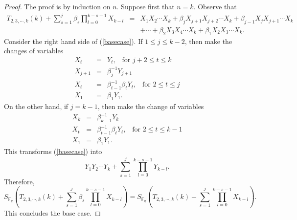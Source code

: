 \begin{proof}
The proof is by induction on $n$.  Suppose first that $n=k$.  Observe that
\begin{eqnarray}\nonumber
\label{basecase}
 T_{2,3,\cdots,k}(k)+\sum_{s=1}^j\beta_s\prod_{l=0}^{k-s-1}X_{k-l}&=& X_1X_2\cdots X_k+\beta_j X_{j+1}X_{j+2}\cdots X_k+\beta_{j-1} X_{j}X_{j+1}\cdots X_k\\
 &&+\cdots+ \beta_2 X_3 X_4\cdots X_k+  \beta_1 X_2 X_3\cdots X_k.
\end{eqnarray}
Consider the right hand side of (\ref{basecase}).  If $1\leq j\leq k-2$, then make the changes of variables
\begin{eqnarray*}
 X_t &=& Y_t, \,\,\, \text{ for }j+2\leq t \leq k \\
 X_{j+1}&=& \beta_j^{-1}Y_{j+1}\\
 X_t&=& \beta_{t-1}^{-1}\beta_t Y_t, \,\,\, \text{ for }2\leq t \leq j\\ 
 X_1&=& \beta_1 Y_1.
\end{eqnarray*}
On the other hand, if $j=k-1$, then make the change of variables
\begin{eqnarray*}
 X_{k}&=& \beta_{k-1}^{-1}Y_{k}\\
 X_t&=& \beta_{t-1}^{-1}\beta_t Y_t, \,\,\, \text{ for }2\leq t \leq k-1\\ 
 X_1&=& \beta_1 Y_1.
\end{eqnarray*}
This transforms (\ref{basecase}) into 
\begin{equation}
  Y_1Y_2\cdots Y_k +\sum_{s=1}^j\prod_{l=0}^{k-s-1}Y_{k-l}.
\end{equation}
Therefore, 
\begin{equation}
 S_{\mathbb{F}_q}\left(T_{2,3,\cdots,k}(k)+\sum_{s=1}^j\beta_s\prod_{l=0}^{k-s-1}X_{k-l}\right)=S_{\mathbb{F}_q}\left(T_{2,3,\cdots,k}(k)+\sum_{s=1}^j\prod_{l=0}^{k-s-1}X_{k-l}\right).
\end{equation}
This concludes the base case.  


\end{proof}
